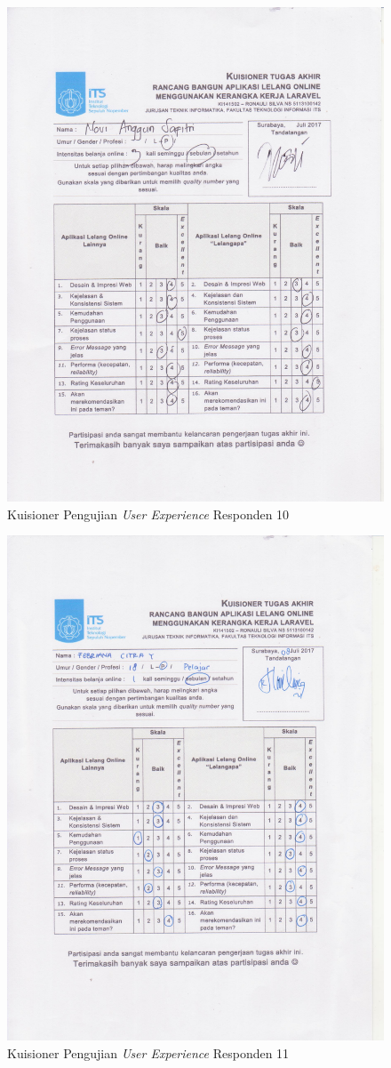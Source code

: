 \begin{figure}[H]
	\centering
	\includegraphics[width=.9\textwidth]{images/bab5/ujipengguna/10.jpg}
	\caption{Kuisioner Pengujian \textit{User Experience} Responden 10}
	\label{quest-10}
\end{figure}
\begin{figure}[H]
	\centering
	\includegraphics[width=.9\textwidth]{images/bab5/ujipengguna/11.jpg}
	\caption{Kuisioner Pengujian \textit{User Experience} Responden 11}
	\label{quest-11}
\end{figure}

